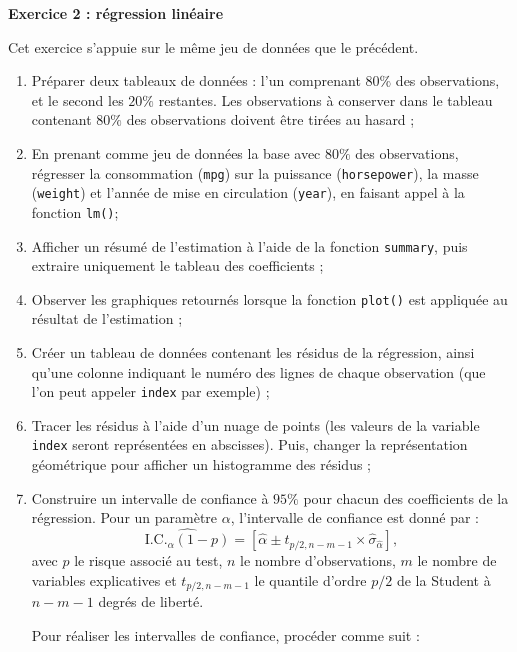 \documentclass[
  11pt,
]{book}
\makeatletter
\numberwithin{equation}{section}
\numberwithin{countremarque}{section}
\newenvironment{exframe}{%
 \def\at@end@of@exframe{}%
 \ifinner\ifhmode%
  \def\at@end@of@exframe{\end{minipage}}%
  \begin{minipage}{\columnwidth}%
 \fi\fi%
 \def\FrameCommand##1{\hskip\@totalleftmargin \hskip-\fboxsep
 \colorbox{shadecolorex}{##1}\hskip-\fboxsep
     \hskip-\linewidth \hskip-\@totalleftmargin \hskip\columnwidth}%
 \MakeFramed {\advance\hsize-\width
   \@totalleftmargin\z@ \linewidth\hsize
   \@setminipage}}%
 {\par\unskip\endMakeFramed%
 \at@end@of@exframe}
\makeatother
\begin{document}
\begin{exframe}
\textbf{Exercice 2 : régression linéaire}

Cet exercice s'appuie sur le même jeu de données que le précédent.

\begin{enumerate}
\def\labelenumi{\arabic{enumi}.}
\item
  Préparer deux tableaux de données : l'un comprenant \(80\%\) des observations, et le second les \(20\%\) restantes. Les observations à conserver dans le tableau contenant \(80\%\) des observations doivent être tirées au hasard ;
\item
  En prenant comme jeu de données la base avec \(80\%\) des observations, régresser la consommation (\texttt{mpg}) sur la puissance (\texttt{horsepower}), la masse (\texttt{weight}) et l'année de mise en circulation (\texttt{year}), en faisant appel à la fonction \texttt{lm()};
\item
  Afficher un résumé de l'estimation à l'aide de la fonction \texttt{summary}, puis extraire uniquement le tableau des coefficients ;
\item
  Observer les graphiques retournés lorsque la fonction \texttt{plot()} est appliquée au résultat de l'estimation ;
\item
  Créer un tableau de données contenant les résidus de la régression, ainsi qu'une colonne indiquant le numéro des lignes de chaque observation (que l'on peut appeler \texttt{index} par exemple) ;
\item
  Tracer les résidus à l'aide d'un nuage de points (les valeurs de la variable \texttt{index} seront représentées en abscisses). Puis, changer la représentation géométrique pour afficher un histogramme des résidus ;
\item
  Construire un intervalle de confiance à \(95\%\) pour chacun des coefficients de la régression. Pour un paramètre \(\alpha\), l'intervalle de confiance est donné par :
  \[\widehat{\textrm{I.C.}_\alpha(1-p)} = \left[ \hat{\alpha} \pm t_{p/2, n-m-1} \times \hat{\sigma}_{\hat{\alpha}}\right],\]
  avec \(p\) le risque associé au test, \(n\) le nombre d'observations, \(m\) le nombre de variables explicatives et \(t_{p/2, n-m-1}\) le quantile d'ordre \(p/2\) de la Student à \(n-m-1\) degrés de liberté.

  Pour réaliser les intervalles de confiance, procéder comme suit :


\end{enumerate}
\end{exframe}
\end{document}
